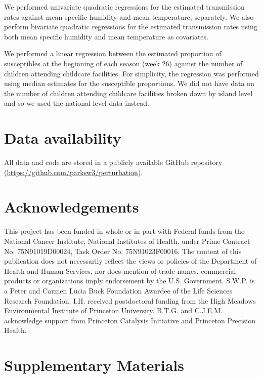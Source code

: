 \documentclass[12pt]{article}
\begin{document}
We performed univariate quadratic regressions for the estimated transmission rates against mean specific humidity and mean temperature, separately.
We also perform bivariate quadratic regressions for the estimated transmission rates using both mean specific humidity and mean temperature as covariates.

We performed a linear regression between the estimated proportion of susceptibles at the beginning of each season (week 26) against the number of children attending childcare facilities.
For simplicity, the regression was performed using median estimates for the susceptible proportions.
We did not have data on the number of children attending childcare facilities broken down by island level and so we used the national-level data instead.

\section*{Data availability}

All data and code are stored in a publicly available GitHub repository (\url{https://github.com/parksw3/perturbation}).

\section*{Acknowledgements}

This project has been funded in whole or in part with Federal funds from the National Cancer Institute, National Institutes of Health, under Prime Contract No. 75N91019D00024, Task Order No. 75N91023F00016. 
The content of this publication does not necessarily reflect the views or policies of the Department of Health and Human Services, nor does mention of trade names, commercial products or organizations imply endorsement by the U.S. Government.
S.W.P. is a Peter and Carmen Lucia Buck Foundation Awardee of the Life Sciences Research Foundation. 
I.H. received postdoctoral funding from the High Meadows Environmental Institute of Princeton University.
B.T.G. and C.J.E.M. acknowledge support from Princeton Catalysis Initiative and Princeton Precision Health.

\pagebreak

\setcounter{figure}{0}
\setcounter{equation}{0}
\renewcommand{\thefigure}{S\arabic{figure}}
\renewcommand{\theequation}{S\arabic{equation}}
\renewcommand{\thetable}{S\arabic{table}}

\section*{Supplementary Materials}
\end{document}
